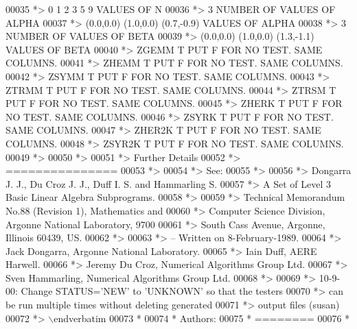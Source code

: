 \begin{DoxyCode}
00035 \textcolor{comment}{*> 0 1 2 3 5 9       VALUES OF N}
00036 \textcolor{comment}{*> 3                 NUMBER OF VALUES OF ALPHA}
00037 \textcolor{comment}{*> (0.0,0.0) (1.0,0.0) (0.7,-0.9)       VALUES OF ALPHA}
00038 \textcolor{comment}{*> 3                 NUMBER OF VALUES OF BETA}
00039 \textcolor{comment}{*> (0.0,0.0) (1.0,0.0) (1.3,-1.1)       VALUES OF BETA}
00040 \textcolor{comment}{*> ZGEMM  T PUT F FOR NO TEST. SAME COLUMNS.}
00041 \textcolor{comment}{*> ZHEMM  T PUT F FOR NO TEST. SAME COLUMNS.}
00042 \textcolor{comment}{*> ZSYMM  T PUT F FOR NO TEST. SAME COLUMNS.}
00043 \textcolor{comment}{*> ZTRMM  T PUT F FOR NO TEST. SAME COLUMNS.}
00044 \textcolor{comment}{*> ZTRSM  T PUT F FOR NO TEST. SAME COLUMNS.}
00045 \textcolor{comment}{*> ZHERK  T PUT F FOR NO TEST. SAME COLUMNS.}
00046 \textcolor{comment}{*> ZSYRK  T PUT F FOR NO TEST. SAME COLUMNS.}
00047 \textcolor{comment}{*> ZHER2K T PUT F FOR NO TEST. SAME COLUMNS.}
00048 \textcolor{comment}{*> ZSYR2K T PUT F FOR NO TEST. SAME COLUMNS.}
00049 \textcolor{comment}{*>}
00050 \textcolor{comment}{*> }
00051 \textcolor{comment}{*> Further Details}
00052 \textcolor{comment}{*> ===============}
00053 \textcolor{comment}{*>}
00054 \textcolor{comment}{*> See:}
00055 \textcolor{comment}{*>}
00056 \textcolor{comment}{*>    Dongarra J. J., Du Croz J. J., Duff I. S. and Hammarling S.}
00057 \textcolor{comment}{*>    A Set of Level 3 Basic Linear Algebra Subprograms.}
00058 \textcolor{comment}{*>}
00059 \textcolor{comment}{*>    Technical Memorandum No.88 (Revision 1), Mathematics and}
00060 \textcolor{comment}{*>    Computer Science Division, Argonne National Laboratory, 9700}
00061 \textcolor{comment}{*>    South Cass Avenue, Argonne, Illinois 60439, US.}
00062 \textcolor{comment}{*>}
00063 \textcolor{comment}{*> -- Written on 8-February-1989.}
00064 \textcolor{comment}{*>    Jack Dongarra, Argonne National Laboratory.}
00065 \textcolor{comment}{*>    Iain Duff, AERE Harwell.}
00066 \textcolor{comment}{*>    Jeremy Du Croz, Numerical Algorithms Group Ltd.}
00067 \textcolor{comment}{*>    Sven Hammarling, Numerical Algorithms Group Ltd.}
00068 \textcolor{comment}{*>}
00069 \textcolor{comment}{*>    10-9-00:  Change STATUS='NEW' to 'UNKNOWN' so that the testers}
00070 \textcolor{comment}{*>              can be run multiple times without deleting generated}
00071 \textcolor{comment}{*>              output files (susan)}
00072 \textcolor{comment}{*> \(\backslash\)endverbatim}
00073 \textcolor{comment}{*}
00074 \textcolor{comment}{*  Authors:}
00075 \textcolor{comment}{*  ========}
00076 \textcolor{comment}{*}

\end{DoxyCode}
